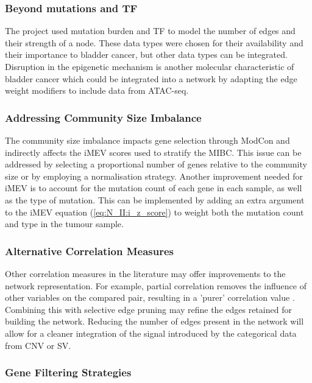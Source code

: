\subsubsection*{Beyond mutations and TF}

The project used mutation burden and TF to model the number of edges and their strength of a node. These data types were chosen for their availability and their importance to bladder cancer, but other data types can be integrated. Disruption in the epigenetic mechanism is another molecular characteristic of bladder cancer \citep{Robertson2017-mg,Tcga2014-dr} which could be integrated into a network by adapting the edge weight modifiers to include data from ATAC-seq.


\subsubsection*{Addressing Community Size Imbalance}

The community size imbalance impacts gene selection through ModCon and indirectly affects the iMEV scores used to stratify the MIBC. This issue can be addressed by selecting a proportional number of genes relative to the community size or by employing a normalisation strategy. Another improvement needed for iMEV is to account for the mutation count of each gene in each sample, as well as the type of mutation. This can be implemented by adding an extra argument to the iMEV equation (\cref{eq:N_II:i_z_score}) to weight both the mutation count and type in the tumour sample.


\subsubsection*{Alternative Correlation Measures}

Other correlation measures in the literature may offer improvements to the network representation. For example, partial correlation removes the influence of other variables on the compared pair, resulting in a 'purer' correlation value \citep{De_la_Fuente2004-ts}. Combining this with selective edge pruning may refine the edges retained for building the network. Reducing the number of edges present in the network will allow for a cleaner integration of the signal introduced by the categorical data from CNV or SV.

\subsubsection*{Gene Filtering Strategies}

